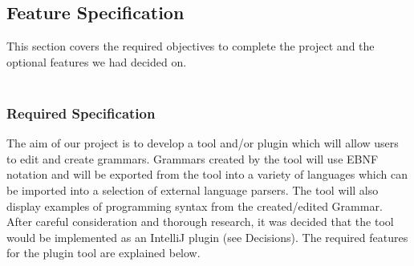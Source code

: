 \documentclass{l3proj}
\begin{document}
\subsection{Feature Specification}
This section covers the required objectives to complete the project and the optional features we had decided on. \\
\\
\subsubsection{Required Specification}
The aim of our project is to develop a tool and/or plugin which will allow users to edit and create grammars. Grammars created by the tool will use EBNF notation and will be exported from the tool into a variety of languages which can be imported into a selection of external language parsers. The tool will also display examples of programming syntax from the created/edited Grammar. After careful consideration and thorough research, it was decided that the  tool would be implemented as an IntelliJ plugin (see Decisions). The required features for the plugin tool are explained below. 
\end{document}

